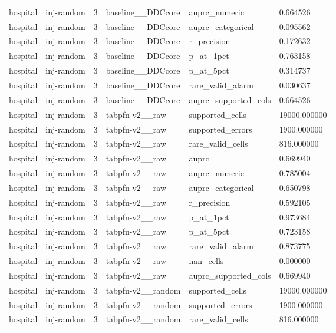 \begin{tabular}{llllll}
hospital & inj-random & 3 & baseline\_\_DDCcore & auprc\_numeric & 0.664526 \\
hospital & inj-random & 3 & baseline\_\_DDCcore & auprc\_categorical & 0.095562 \\
hospital & inj-random & 3 & baseline\_\_DDCcore & r\_precision & 0.172632 \\
hospital & inj-random & 3 & baseline\_\_DDCcore & p\_at\_1pct & 0.763158 \\
hospital & inj-random & 3 & baseline\_\_DDCcore & p\_at\_5pct & 0.314737 \\
hospital & inj-random & 3 & baseline\_\_DDCcore & rare\_valid\_alarm & 0.030637 \\
hospital & inj-random & 3 & baseline\_\_DDCcore & auprc\_supported\_cols & 0.664526 \\
hospital & inj-random & 3 & tabpfn-v2\_\_raw & supported\_cells & 19000.000000 \\
hospital & inj-random & 3 & tabpfn-v2\_\_raw & supported\_errors & 1900.000000 \\
hospital & inj-random & 3 & tabpfn-v2\_\_raw & rare\_valid\_cells & 816.000000 \\
hospital & inj-random & 3 & tabpfn-v2\_\_raw & auprc & 0.669940 \\
hospital & inj-random & 3 & tabpfn-v2\_\_raw & auprc\_numeric & 0.785004 \\
hospital & inj-random & 3 & tabpfn-v2\_\_raw & auprc\_categorical & 0.650798 \\
hospital & inj-random & 3 & tabpfn-v2\_\_raw & r\_precision & 0.592105 \\
hospital & inj-random & 3 & tabpfn-v2\_\_raw & p\_at\_1pct & 0.973684 \\
hospital & inj-random & 3 & tabpfn-v2\_\_raw & p\_at\_5pct & 0.723158 \\
hospital & inj-random & 3 & tabpfn-v2\_\_raw & rare\_valid\_alarm & 0.873775 \\
hospital & inj-random & 3 & tabpfn-v2\_\_raw & nan\_cells & 0.000000 \\
hospital & inj-random & 3 & tabpfn-v2\_\_raw & auprc\_supported\_cols & 0.669940 \\
hospital & inj-random & 3 & tabpfn-v2\_\_random & supported\_cells & 19000.000000 \\
hospital & inj-random & 3 & tabpfn-v2\_\_random & supported\_errors & 1900.000000 \\
hospital & inj-random & 3 & tabpfn-v2\_\_random & rare\_valid\_cells & 816.000000 \\

\end{tabular}
